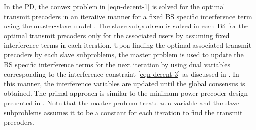 In the \acl{PD}, the convex problem in \eqref{eqn-decent-1} is solved for the optimal transmit precoders in an iterative manner for a fixed \ac{BS} specific interference term  using the master-slave model \cite{pennanen2011decentralized}. The slave subproblem is solved in each \ac{BS} for the optimal transmit precoders only for the associated users by assuming fixed interference terms  in each  iteration. Upon finding the optimal associated transmit precoders by each slave subproblems, the master problem is used to update the \ac{BS} specific interference terms  for the next iteration by using dual variables corresponding to the interference constraint \eqref{eqn-decent-3} as discussed in \cite{pennanen2011decentralized}. In this manner, the interference variables are updated until the global consensus is obtained. The primal approach is similar to the minimum power precoder design presented in \cite{pennanen2011decentralized}. Note that the master problem treats  as a variable and the slave subproblems assumes it to be a constant for each iteration to find the transmit precoders.
\begin{comment}
The \acl{PD} approach decomposes the problem by fixing the interference variables \me{\zeta_{l,k,n,b} \forall k,b} in order to perform the precoder design independently across each \ac{BS}. Once the optimal precoders are designed at each \ac{BS} with the fixed interference constraints \eqref{eqn-decent-3}, the dual variables corresponding to the interference constraints are exchanged between the cooperating \acp{BS} in \me{\mc{B}} to update the interference variables \me{\zeta_{l,k,n,b}} for the next iteration until convergence. The primal approach is discussed extensively for the min-power problem in \cite{pennanen2011decentralized} and much of the current work follows similar approach. 

\subsubsection*{Convergence}
The convergence of the primal decomposition is similar to that of the centralized problem if the interference variables \me{\zeta_{l,k,n,b}} are allowed to converge to a stationary point. In practice, we can limit the number of exchanges to \me{J_{\max}} after which the \ac{SCA} update is performed until convergence or for \me{I_{\max}} times. The update of \me{\tilde{p}_{l,k,n}, \tilde{q}_{l,k,n}} and \me{\tilde{\beta}_{l,k,n}} can be made in conjunction with the receiver update \me{\mvec{W}{k,n}}. The receiver update can be made by using the precoded pilot transmission from each user as in \cite{komulainen2013effective}. 
\end{comment}